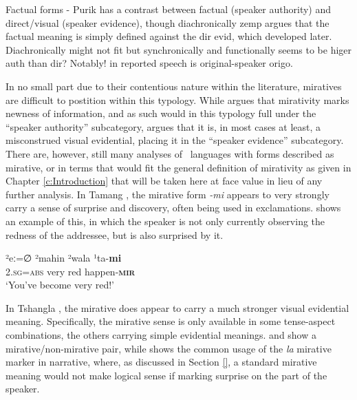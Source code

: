 Factual forms - Purik has a contrast between factual (speaker authority) and direct/visual (speaker evidence), though diachronically zemp argues that the factual meaning is simply defined against the dir evid, which developed later. Diachronically might not fit but synchronically and functionally seems to be higer auth than dir? Notably! in reported speech is original-speaker origo.

In no small part due to their contentious nature within the literature, miratives are difficult to postition within this typology. While  argues that mirativity marks newness of information, and as such would in this typology full under the ``speaker authority'' subcategory,  argues that it is, in most cases at least, a misconstrued visual evidential, placing it in the ``speaker evidence'' subcategory. There are, however, still many analyses of \lfam\ languages with forms described as mirative, or in terms that would fit the general definition of mirativity as given in Chapter \ref{c:Introduction} that will be taken here at face value in lieu of any further analysis. In Tamang \cite[Tamangic: Nepal,][]{OwenSmith2014}, the mirative form \textit{-mi} appears to very strongly carry a sense of surprise and discovery, often being used in exclamations.  shows an example of this, in which the speaker is not only currently observing the redness of the addressee, but is also surprised by it.

\begin{exe}
        \ex\label{e:Description:TamangMirative}
        \gll ²eː=∅ ²mahin ²wala ¹ta-\textbf{mi} \\
        \textsc{2.sg=abs} very red happen-\textbf{\textsc{mir}} \\
        \glt `You've become very red!' \cite[115]{OwenSmith2014}
\end{exe}

In Tshangla \cite[Internal isolate: Bhutan,][228]{Andvik2010}, the mirative does appear to carry a much stronger visual evidential meaning. Specifically, the mirative sense is only available in some tense-aspect combinations, the others carrying simple evidential meanings.  and  show a mirative/non-mirative pair, while  shows the common usage of the \textit{la} mirative marker in narrative, where, as discussed in Section \ref{}, a standard mirative meaning would not make logical sense if marking surprise on the part of the speaker.

